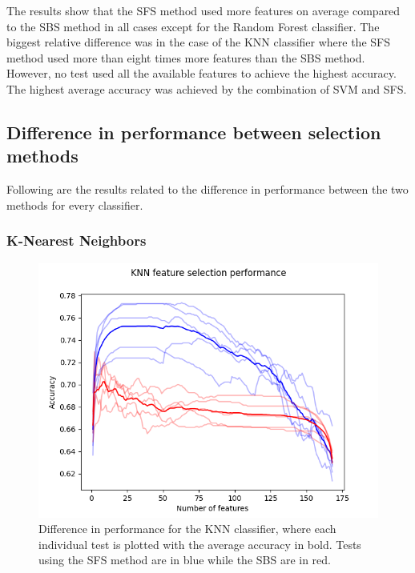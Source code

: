 \documentclass{kththesis}
\begin{document}
The results show that the SFS method used more features on average compared to the SBS method in all cases except for the Random Forest classifier. The biggest relative difference was in the case of the KNN classifier where the SFS method used more than eight times more features than the SBS method. However, no test used all the available features to achieve the highest accuracy. The highest average accuracy was achieved by the combination of SVM and SFS.

\newpage

\subsection{Difference in performance between selection methods}

Following are the results related to the difference in performance between the two methods for every classifier.

\subsubsection{K-Nearest Neighbors}

\begin{figure}[h!]
  \begin{center}
    \includegraphics[scale=0.8]{../new_plots/knn_graph.png}
    \caption{Difference in performance for the KNN classifier, where each individual test is plotted with the average accuracy in bold. Tests using the SFS method are in blue while the SBS are in red. }
  \end{center}
\end{figure}
\end{document}

